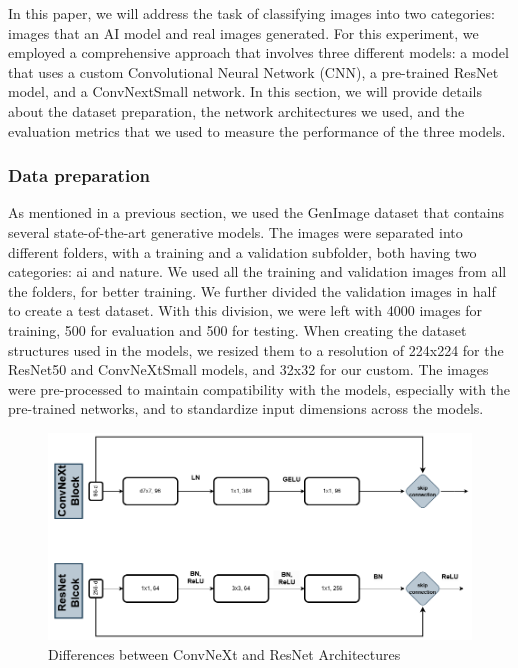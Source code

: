 \documentclass[runningheads]{llncs}
\begin{document}
In this paper, we will address the task of classifying images into two categories: images that an AI model and real images generated. For this experiment, we employed a comprehensive approach that involves three different models: a model that uses a custom Convolutional Neural Network (CNN), a pre-trained ResNet model, and a ConvNextSmall network. In this section, we will provide details about the dataset preparation, the network architectures we used, and the evaluation metrics that we used to measure the performance of the three models. 

\subsubsection{Data preparation} 
As mentioned in a previous section, we used the GenImage dataset that contains several state-of-the-art generative models. The images were separated into different folders, with a training and a validation subfolder, both having two categories: ai and nature. We used all the training and validation images from all the folders, for better training. We further divided the validation images in half to create a test dataset. With this division, we were left with 4000 images for training, 500 for evaluation and 500 for testing. When creating the dataset structures used in the models, we resized them to a resolution of 224x224 for the ResNet50 and ConvNeXtSmall models, and 32x32 for our custom. The images were pre-processed to maintain compatibility with the models, especially with the pre-trained networks, and to standardize input dimensions across the models.

\vspace*{-2ex} %
\begin{figure}[H]
    \centering
    \includegraphics[width=\textwidth]{graphics/ConvRes.png} %
    \caption{Differences between ConvNeXt and ResNet Architectures}
    \label{fig:custom-cnn}
\end{figure}
\vspace*{-2ex} %
\end{document}

